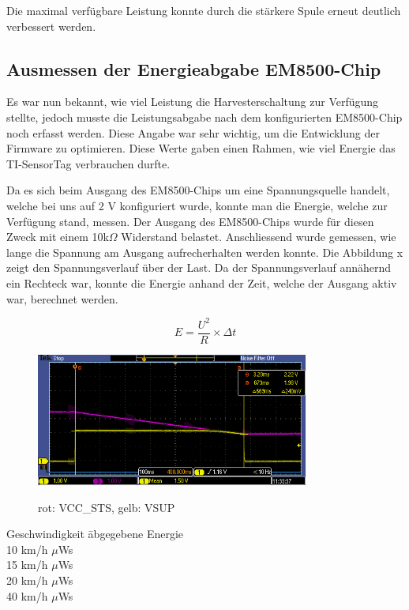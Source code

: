 Die maximal verfügbare Leistung konnte durch die stärkere Spule erneut deutlich verbessert werden. 

\subsection{Ausmessen der Energieabgabe EM8500-Chip}
\label{em_enerige_ausgang}

Es war nun bekannt, wie viel Leistung die Harvesterschaltung zur Verfügung stellte, jedoch musste die Leistungsabgabe nach dem konfigurierten EM8500-Chip noch erfasst werden. Diese Angabe war sehr wichtig, um die Entwicklung der Firmware zu optimieren. Diese Werte gaben einen Rahmen, wie viel Energie das TI-SensorTag verbrauchen durfte.

Da es sich beim Ausgang des EM8500-Chips um eine Spannungsquelle handelt, welche bei uns auf 2 V konfiguriert wurde, konnte man die Energie, welche zur Verfügung stand, messen. Der Ausgang des EM8500-Chips wurde für diesen Zweck mit einem 10k$\Omega$ Widerstand belastet. Anschliessend wurde gemessen, wie lange die Spannung am Ausgang aufrecherhalten werden konnte. Die Abbildung x zeigt den Spannungsverlauf über der Last. Da der Spannungsverlauf annähernd ein Rechteck war, konnte die Energie anhand der Zeit, welche der Ausgang aktiv war, berechnet werden.

\begin{equation}
	E = \frac{U^2}{R}  \times \Delta t
\end{equation}

\begin{figure}[ht]
  \includegraphics[width=0.80\textwidth]{3Vorgehen/imag/EnergieEMChip15kmh.PNG}
  \label{EnergieEMChip15kmh} 
  \caption{rot: VCC\_STS, gelb: VSUP}
\end{figure}



\label{tab:em_out_zsm}
\begin{tabbing}
    Geschwindigkeit   	\quad\= abgegebene Energie    \\[0.8ex]
    10 km/h		         $\mu$Ws\\
	15 km/h		         $\mu$Ws\\
	20 km/h		         $\mu$Ws\\
	40 km/h		         $\mu$Ws\\
\end{tabbing}

